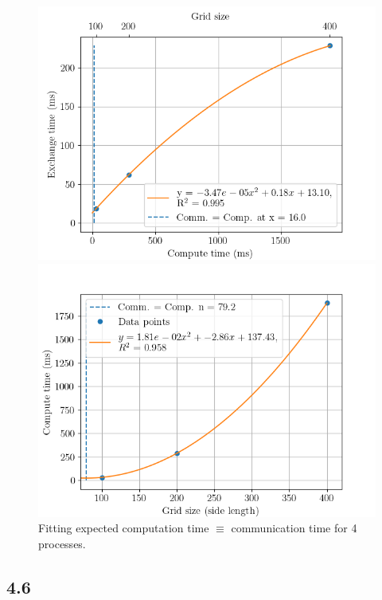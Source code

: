 \begin{figure}[H]
    \centering
    \begin{minipage}{0.48\textwidth}
        \centering
        \includegraphics[width=\linewidth]{../fig/lab2/estimate25.png}
    \end{minipage}%
    \hspace{0.02\textwidth}
    \begin{minipage}{0.48\textwidth}
        \centering
        \includegraphics[width=\linewidth]{../fig/lab2/grid_to_time_fit.png}
    \end{minipage}
    \caption{Fitting expected computation time $\equiv$ communication time for 4 processes.}
    \label{fig:comp_eq_comm}
\end{figure}
\subsection{4.6}
